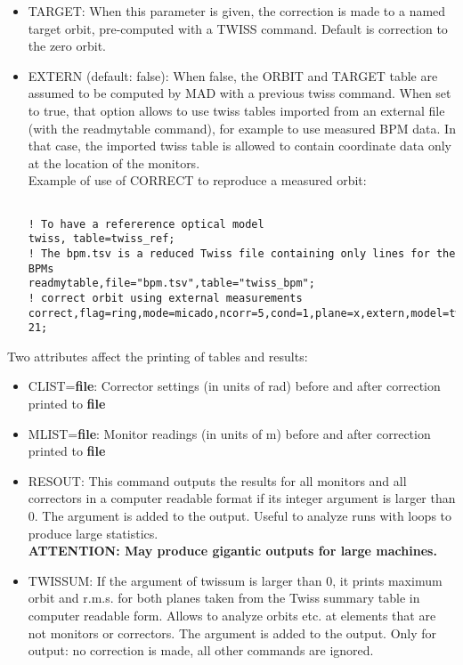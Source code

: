 \begin{itemize}
	\item TARGET: When this parameter is given, the correction is made to a named target orbit, pre-computed with a TWISS command. Default is correction to the zero orbit. 
	\item EXTERN (default: false): When false, the ORBIT and TARGET table are assumed to be computed by MAD with a previous twiss command. When set to true, that option allows to use twiss tables imported from an external file (with the readmytable command), for example to use measured BPM data. In that case, the imported twiss table is allowed to contain coordinate data only at the location of the monitors. 
\\ Example of use of CORRECT to reproduce a measured orbit: 
\begin{verbatim}

! To have a refererence optical model
twiss, table=twiss_ref;
! The bpm.tsv is a reduced Twiss file containing only lines for the BPMs
readmytable,file="bpm.tsv",table="twiss_bpm";
! correct orbit using external measurements
correct,flag=ring,mode=micado,ncorr=5,cond=1,plane=x,extern,model=twiss_ref,orbit=twiss_ref,target=twiss_bpm,error=1.0e-21;
\end{verbatim}
\end{itemize} Two attributes affect the printing of tables and results: 
\begin{itemize}
	\item CLIST=\textbf{file}: Corrector settings (in units of rad) before and after correction printed to \textbf{file}
	\item MLIST=\textbf{file}: Monitor readings (in units of m) before and after correction printed to \textbf{file}
	\item RESOUT: This command outputs the results for all monitors and all correctors in a computer readable format if its integer argument is larger than 0. The argument is added to the output. Useful to analyze runs with loops to produce large statistics. 
\\\textbf{ATTENTION: May produce gigantic outputs for large machines.}
\\
	\item TWISSUM:  If the argument of twissum is larger than 0, it prints maximum orbit and r.m.s. for both planes taken from the Twiss summary table in computer readable form. Allows to analyze orbits etc. at elements that are not monitors or correctors. The argument is added to the output.  Only for output: no correction is made, all other commands are ignored. 
\end{itemize}

